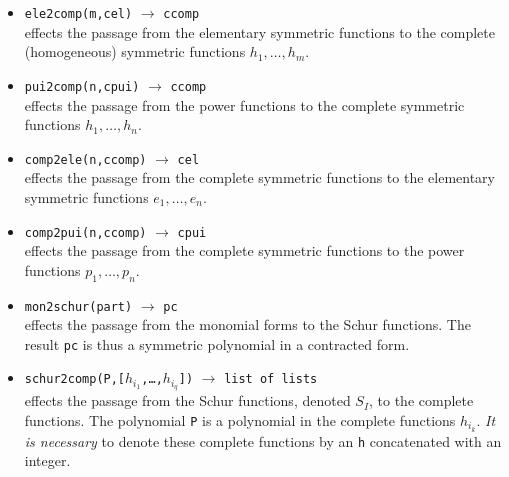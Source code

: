 \documentclass[11pt]{article}
\begin{document}
\begin{itemize}
  \item \texttt{ele2comp(m,cel)} 
    $\longrightarrow$ \texttt{ccomp} \\
    effects the passage from the elementary symmetric functions to the complete
    (homogeneous) symmetric functions $h_1,\ldots,h_m$.
  \item \texttt{pui2comp(n,cpui)} 
    $\longrightarrow$ \texttt{ccomp} \\
    effects the passage from the power functions to the complete symmetric
    functions $h_1,\ldots,h_n$.
  \item \texttt{comp2ele(n,ccomp)} 
    $\longrightarrow$ \texttt{cel} \\
    effects the passage from the complete symmetric functions to the elementary
    symmetric functions $e_1,\ldots,e_n$.
  \item \texttt{comp2pui(n,ccomp)} 
    $\longrightarrow$ \texttt{cpui} \\
    effects the passage from the complete symmetric functions to the power
    functions $p_1,\ldots,p_n$.
  \item \texttt{mon2schur(part)} 
    $\longrightarrow$ \texttt{pc} \\
    effects the passage from the monomial forms to the Schur functions.  The
    result \texttt{pc} is thus a symmetric polynomial in a contracted form.
  \item \texttt{schur2comp(P,[$h_{i_1}$,\dots,$h_{i_q}$])}
    $\longrightarrow$ \texttt{list of lists} \\
    effects the passage from the Schur functions, denoted $S_I$, to the complete
    functions.  The polynomial \texttt{P} is a polynomial in the complete
    functions $h_{i_k}$.  \emph{It is necessary} to denote these complete
    functions by an \texttt{h} concatenated with an integer.
\end{itemize}
\end{document}
